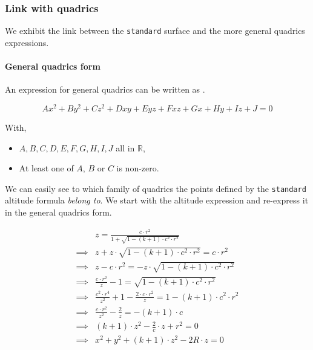\subsubsection{Link with quadrics}
We exhibit the link between the \lstinline{standard} surface and the
more general quadrics expressions.

\paragraph{General quadrics form}
An expression for general quadrics can be written as \cite{wiki:quadric}.

\begin{equation}
A x^2 + B y^2 + C z^2 + D x y + E y z + F x z + G x + H y + I z + J = 0
\end{equation}

With,
\begin{itemize}
\item $A, B, C, D, E, F, G, H, I, J$ all in $\mathbb{R}$,
\item At least one of $A$, $B$ or $C$ is non-zero.
\end{itemize}

We can easily see to which family of quadrics the points defined by the
\lstinline{standard} altitude formula \emph{belong to}. We start with
the altitude expression and re-express it in the general quadrics form.

\begin{equation} \begin{split}
&z = \frac{c \cdot r^2}{1 + \sqrt{1 - (k + 1) \cdot c^2 \cdot r^2}} \\
\implies & z + z \cdot \sqrt{1 - (k+1) \cdot c^2 \cdot r^2} = c \cdot r^2 \\
\implies & z - c \cdot r^2 = - z \cdot \sqrt{1 - (k + 1) \cdot c^2 \cdot r^2} \\
\implies & \frac{c \cdot r^2}{z} - 1 = \sqrt{1 - (k + 1) \cdot c^2 \cdot r^2} \\
\implies & \frac{c^2 \cdot r^4}{z^2} + 1 - \frac{2 \cdot c \cdot r^2}{z} =
           1 - (k + 1) \cdot c^2 \cdot r^2 \\
\implies & \frac{c \cdot r^2}{z^2} - \frac{2}{z} = - (k + 1) \cdot c \\
\implies & (k + 1) \cdot z^2 - \frac{2}{c} \cdot z + r^2 = 0 \\
\implies & x^2 + y^2 + (k + 1) \cdot z^2 - 2 R \cdot z = 0
\end{split} \end{equation}

